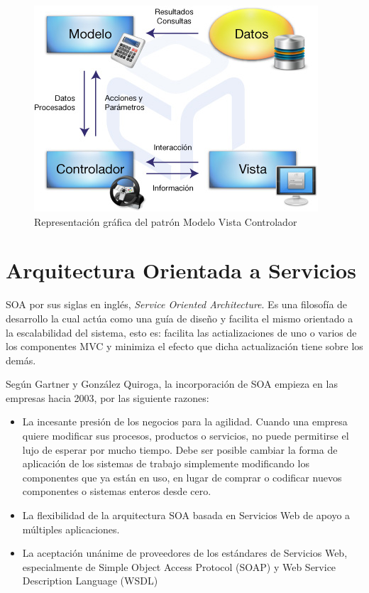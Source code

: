     \begin{figure}[htbp!]
        \begin{center}
            \includegraphics[width=.8\textwidth]{figures/Arquitectura-MVC}
        \end{center}
        \caption{Representación gráfica del patrón Modelo Vista Controlador\cite{MVC-imagen}}
        \label{mvc-image}
    \end{figure}
    
    \section{Arquitectura Orientada a Servicios}
    SOA por sus siglas en inglés, \textit{Service Oriented Architecture}. Es una filosofía de desarrollo la cual actúa como una guía de diseño y facilita el mismo orientado a la escalabilidad del sistema, esto es: facilita las actializaciones de uno o varios de los componentes MVC y minimiza el efecto que dicha actualización tiene sobre los demás.
    
    Según Gartner\cite{SOA-libroGartner} y González Quiroga\cite{SOA-tesis}, la incorporación de SOA empieza en las empresas hacia 2003, por las siguiente razones:
    
    \begin{itemize}
        \item La incesante presión de los negocios para la agilidad. Cuando una empresa quiere
        modificar sus procesos, productos o servicios, no puede permitirse el lujo de esperar por
        mucho tiempo. Debe ser posible cambiar la forma de aplicación de los sistemas de
        trabajo simplemente modificando los componentes que ya están en uso, en lugar de
        comprar o codificar nuevos componentes o sistemas enteros desde cero.
        
        \item La flexibilidad de la arquitectura SOA basada en Servicios Web de apoyo a múltiples
        aplicaciones.
        
        \item  La aceptación unánime de proveedores de los estándares de Servicios Web,
        especialmente de Simple Object Access Protocol (SOAP) y Web Service Description
        Language (WSDL)\cite{SOA-libroGartner}
        
    \end{itemize}
    
